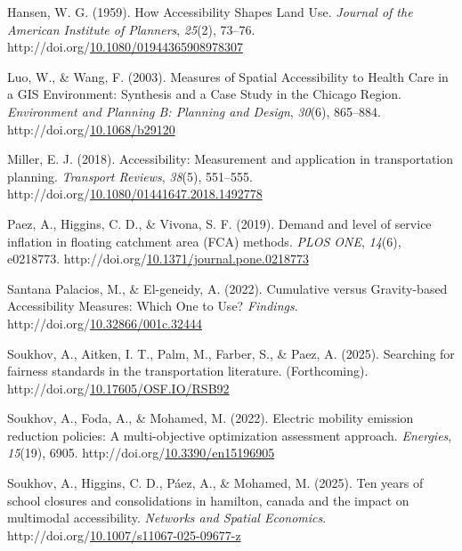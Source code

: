 \documentclass[
11pt, %
oneside, %
english, %
singlespacing, %
]{macthesis} %
\newlength{\cslhangindent}
\newenvironment{CSLReferences}[2] %
{\begin{list}{}{%
	\setlength{\itemindent}{0pt}
	\setlength{\leftmargin}{0pt}
	\setlength{\parsep}{0pt}
	\ifodd #1
	\setlength{\leftmargin}{\cslhangindent}
	\setlength{\itemindent}{-1\cslhangindent}
	\fi
	\setlength{\itemsep}{#2\baselineskip}}}
{\end{list}}
\begin{document}
\begin{CSLReferences}{1}{0}
Hansen, W. G. (1959). How Accessibility Shapes Land Use. \emph{Journal of the American Institute of Planners}, \emph{25}(2), 73--76. http://doi.org/\href{https://doi.org/10.1080/01944365908978307}{10.1080/01944365908978307}

Luo, W., \& Wang, F. (2003). Measures of Spatial Accessibility to Health Care in a GIS Environment: Synthesis and a Case Study in the Chicago Region. \emph{Environment and Planning B: Planning and Design}, \emph{30}(6), 865--884. http://doi.org/\href{https://doi.org/10.1068/b29120}{10.1068/b29120}

Miller, E. J. (2018). Accessibility: Measurement and application in transportation planning. \emph{Transport Reviews}, \emph{38}(5), 551--555. http://doi.org/\href{https://doi.org/10.1080/01441647.2018.1492778}{10.1080/01441647.2018.1492778}

Paez, A., Higgins, C. D., \& Vivona, S. F. (2019). Demand and level of service inflation in floating catchment area ({FCA}) methods. \emph{{PLOS} {ONE}}, \emph{14}(6), e0218773. http://doi.org/\href{https://doi.org/10.1371/journal.pone.0218773}{10.1371/journal.pone.0218773}

Santana Palacios, M., \& El-geneidy, A. (2022). Cumulative versus Gravity-based Accessibility Measures: Which One to Use? \emph{Findings}. http://doi.org/\href{https://doi.org/10.32866/001c.32444}{10.32866/001c.32444}

Soukhov, A., Aitken, I. T., Palm, M., Farber, S., \& Paez, A. (2025). Searching for fairness standards in the transportation literature. (Forthcoming). http://doi.org/\href{https://doi.org/10.17605/OSF.IO/RSB92}{10.17605/OSF.IO/RSB92}

Soukhov, A., Foda, A., \& Mohamed, M. (2022). Electric mobility emission reduction policies: A multi-objective optimization assessment approach. \emph{Energies}, \emph{15}(19), 6905. http://doi.org/\href{https://doi.org/10.3390/en15196905}{10.3390/en15196905}

Soukhov, A., Higgins, C. D., Páez, A., \& Mohamed, M. (2025). Ten years of school closures and consolidations in hamilton, canada and the impact on multimodal accessibility. \emph{Networks and Spatial Economics}. http://doi.org/\href{https://doi.org/10.1007/s11067-025-09677-z}{10.1007/s11067-025-09677-z}


\end{CSLReferences}
\end{document}
